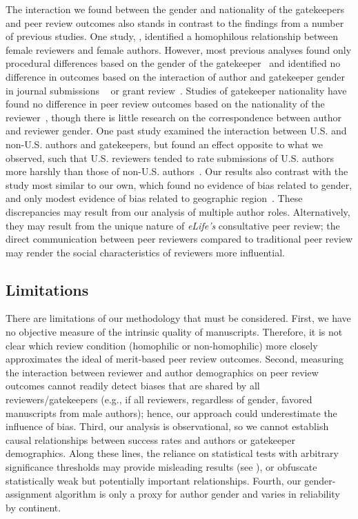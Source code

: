 \documentclass[10pt,letterpaper]{article}
\begin{document}
The interaction we found between the gender and nationality of the gatekeepers and peer review outcomes also stands in contrast to the findings from a number of previous studies. One study, \cite{lloyd_gender_1990}, identified a homophilous relationship between female reviewers and female authors. However, most previous analyses found only procedural differences based on the gender of the gatekeeper~\cite{fox_editor_2015, wing_differences_2010, borsuk_name_2009, gilbert_is_1994} and identified no difference in outcomes based on the interaction of author and gatekeeper gender in journal submissions ~\cite{bornmann_gatekeepers_2007, fox_editor_2015, petty_review_1999} or grant review~\cite{mutz_does_2012}. Studies of gatekeeper nationality have found no difference in peer review outcomes based on the nationality of the reviewer~\cite{bornmann_gatekeepers_2007, zhang_effect_2012}, though there is little research on the correspondence between author and reviewer gender. One past study examined the interaction between U.S. and non-U.S. authors and gatekeepers, but found an effect opposite to what we observed, such that U.S. reviewers tended to rate submissions of U.S. authors more harshly than those of non-U.S. authors~\cite{link_us_1998}. Our results also contrast with the study most similar to our own, which found no evidence of bias related to gender, and only modest evidence of bias related to geographic region~\cite{walker_personal_2015}. These discrepancies may result from our analysis of multiple author roles. Alternatively, they may result from the unique nature of \textit{eLife’s} consultative peer review; the direct communication between peer reviewers compared to traditional peer review may render the social characteristics of reviewers more influential. 

\subsection*{Limitations}
There are limitations of our methodology that must be considered. First, we have no objective measure of the intrinsic quality of manuscripts. Therefore, it is not clear which review condition (homophilic or non-homophilic) more closely approximates the ideal of merit-based peer review outcomes. Second, measuring the interaction between reviewer and author demographics on peer review outcomes cannot readily detect biases that are shared by all reviewers/gatekeepers (e.g., if all reviewers, regardless of gender, favored manuscripts from male authors); hence, our approach could underestimate the influence of bias. Third, our analysis is observational, so we cannot establish causal relationships between success rates and authors or gatekeeper demographics. Along these lines, the reliance on statistical tests with arbitrary significance thresholds may provide misleading results (see \cite{gelman_difference_2006}), or obfuscate statistically weak but potentially important relationships. Fourth, our gender-assignment algorithm is only a proxy for author gender and varies in reliability by continent. 
\end{document}
